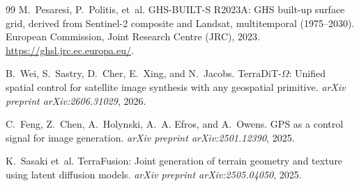 \documentclass[11pt]{article}
\begin{document}
\begin{thebibliography}{99}
M.~Pesaresi, P.~Politis, et~al.
\newblock GHS-BUILT-S R2023A: GHS built-up surface grid, derived from
Sentinel-2 composite and Landsat, multitemporal (1975--2030).
\newblock European Commission, Joint Research Centre (JRC), 2023.
\newblock \url{https://ghsl.jrc.ec.europa.eu/}.

B.~Wei, S.~Sastry, D.~Cher, E.~Xing, and N.~Jacobs.
\newblock TerraDiT-$\Omega$: Unified spatial control for satellite image
synthesis with any geospatial primitive.
\newblock \emph{arXiv preprint arXiv:2606.31029}, 2026.

C.~Feng, Z.~Chen, A.~Holynski, A.~A. Efros, and A.~Owens.
\newblock GPS as a control signal for image generation.
\newblock \emph{arXiv preprint arXiv:2501.12390}, 2025.

K.~Sasaki et~al.
\newblock TerraFusion: Joint generation of terrain geometry and texture
using latent diffusion models.
\newblock \emph{arXiv preprint arXiv:2505.04050}, 2025.

\end{thebibliography}
\end{document}
